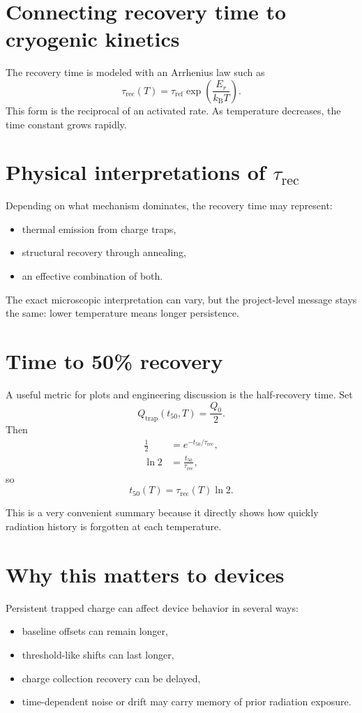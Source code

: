 \documentclass[11pt]{article}
\newcommand{\kb}{k_\mathrm{B}}
\begin{document}
\section{Connecting recovery time to cryogenic kinetics}
The recovery time is modeled with an Arrhenius law such as
\begin{equation}
\tau_{\mathrm{rec}}(T) = \tau_{\mathrm{ref}} \exp\!\left(\frac{E_r}{\kb T}\right).
\end{equation}
This form is the reciprocal of an activated rate. As temperature decreases, the time constant grows rapidly.

\section{Physical interpretations of $\tau_{\mathrm{rec}}$}
Depending on what mechanism dominates, the recovery time may represent:
\begin{itemize}
    \item thermal emission from charge traps,
    \item structural recovery through annealing,
    \item an effective combination of both.
\end{itemize}

The exact microscopic interpretation can vary, but the project-level message stays the same: lower temperature means longer persistence.

\section{Time to 50\% recovery}
A useful metric for plots and engineering discussion is the half-recovery time. Set
\begin{equation}
Q_{\mathrm{trap}}(t_{50},T)=\frac{Q_0}{2}.
\end{equation}
Then
\begin{align}
\frac{1}{2} &= e^{-t_{50}/\tau_{\mathrm{rec}}}, \\
\ln 2 &= \frac{t_{50}}{\tau_{\mathrm{rec}}},
\end{align}
so
\begin{equation}
t_{50}(T)=\tau_{\mathrm{rec}}(T)\ln 2.
\end{equation}

This is a very convenient summary because it directly shows how quickly radiation history is forgotten at each temperature.

\section{Why this matters to devices}
Persistent trapped charge can affect device behavior in several ways:
\begin{itemize}
    \item baseline offsets can remain longer,
    \item threshold-like shifts can last longer,
    \item charge collection recovery can be delayed,
    \item time-dependent noise or drift may carry memory of prior radiation exposure.
\end{itemize}
\end{document}
